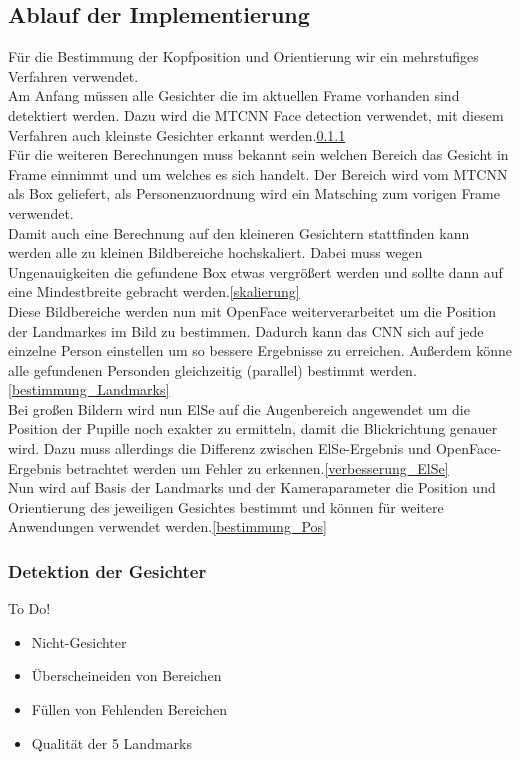 \subsection{Ablauf der Implementierung}
Für die Bestimmung der Kopfposition und Orientierung wir ein mehrstufiges Verfahren verwendet.\\
Am Anfang müssen alle Gesichter die im aktuellen Frame vorhanden sind detektiert werden. Dazu wird die MTCNN Face detection verwendet, mit diesem Verfahren auch kleinste Gesichter erkannt werden.\ref{detection_Gesicht}\\
Für die weiteren Berechnungen muss bekannt sein welchen Bereich das Gesicht in Frame einnimmt und um welches es sich handelt. Der Bereich wird vom MTCNN als Box geliefert, als Personenzuordnung wird ein Matsching zum vorigen Frame verwendet.\\
Damit auch eine Berechnung auf den kleineren Gesichtern stattfinden kann werden alle zu kleinen Bildbereiche hochskaliert. Dabei muss wegen Ungenauigkeiten die gefundene Box etwas vergrößert werden und sollte dann auf eine Mindestbreite gebracht werden.\ref{skalierung}\\
Diese Bildbereiche werden nun mit OpenFace weiterverarbeitet um die Position der Landmarkes im Bild zu bestimmen. Dadurch kann das CNN sich auf jede einzelne Person einstellen um so bessere Ergebnisse zu erreichen. Außerdem könne alle gefundenen Personden gleichzeitig (parallel) bestimmt werden.\ref{bestimmung_Landmarks}\\
Bei großen Bildern wird nun ElSe auf die Augenbereich angewendet um die Position der Pupille noch exakter zu ermitteln, damit die Blickrichtung genauer wird. Dazu muss allerdings die Differenz zwischen ElSe-Ergebnis und OpenFace-Ergebnis betrachtet werden um Fehler zu erkennen.\ref{verbesserung_ElSe}\\
Nun wird auf Basis der Landmarks und der Kameraparameter die Position und Orientierung des jeweiligen Gesichtes bestimmt und können für weitere Anwendungen verwendet werden.\ref{bestimmung_Pos}
\subsubsection{Detektion der Gesichter}
\label{detection_Gesicht}
To Do!
\begin{itemize}
\item Nicht-Gesichter
\item Überscheineiden von Bereichen
\item Füllen von Fehlenden Bereichen
\item Qualität der 5 Landmarks
\end{itemize}

